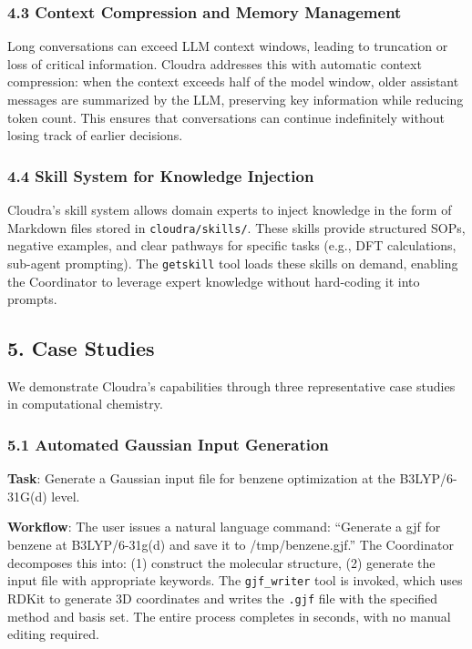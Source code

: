\hypertarget{context-compression-and-memory-management}{%
\subsubsection{4.3 Context Compression and Memory
Management}\label{context-compression-and-memory-management}}

Long conversations can exceed LLM context windows, leading to truncation
or loss of critical information. Cloudra addresses this with automatic
context compression: when the context exceeds half of the model window,
older assistant messages are summarized by the LLM, preserving key
information while reducing token count. This ensures that conversations
can continue indefinitely without losing track of earlier decisions.

\hypertarget{skill-system-for-knowledge-injection}{%
\subsubsection{4.4 Skill System for Knowledge
Injection}\label{skill-system-for-knowledge-injection}}

Cloudra's skill system allows domain experts to inject knowledge in the
form of Markdown files stored in \texttt{cloudra/skills/}. These skills
provide structured SOPs, negative examples, and clear pathways for
specific tasks (e.g., DFT calculations, sub-agent prompting). The
\texttt{getskill} tool loads these skills on demand, enabling the
Coordinator to leverage expert knowledge without hard-coding it into
prompts.

\hypertarget{case-studies}{%
\subsection{5. Case Studies}\label{case-studies}}

We demonstrate Cloudra's capabilities through three representative case
studies in computational chemistry.

\hypertarget{automated-gaussian-input-generation}{%
\subsubsection{5.1 Automated Gaussian Input
Generation}\label{automated-gaussian-input-generation}}

\textbf{Task}: Generate a Gaussian input file for benzene optimization
at the B3LYP/6-31G(d) level.

\textbf{Workflow}: The user issues a natural language command:
``Generate a gjf for benzene at B3LYP/6-31g(d) and save it to
/tmp/benzene.gjf.'' The Coordinator decomposes this into: (1) construct
the molecular structure, (2) generate the input file with appropriate
keywords. The \texttt{gjf\_writer} tool is invoked, which uses RDKit to
generate 3D coordinates and writes the \texttt{.gjf} file with the
specified method and basis set. The entire process completes in seconds,
with no manual editing required.

